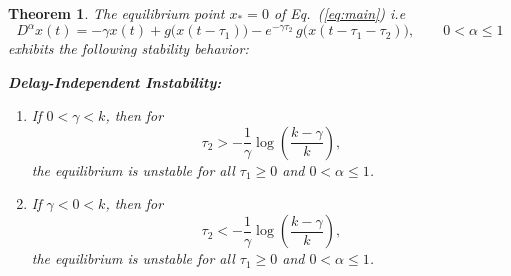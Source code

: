 \documentclass[10pt,a4paper]{amsart}
\newtheorem{theorem}{Theorem}
\begin{document}
\begin{theorem}
	\label{thmcase2_unified}
	The equilibrium point $x_* = 0$ of Eq.~(\ref{eq:main}) i.e 
		\begin{equation}
		D^{\alpha} x(t)
		= -\gamma x(t)
		+ g\big(x(t - \tau_1)\big)
		- e^{-\gamma \tau_2}\, g\big(x(t - \tau_1 - \tau_2)\big),
		\qquad 0 < \alpha \le 1
	\end{equation}
	 exhibits the following stability behavior:
	
	\textbf{Delay-Independent Instability:}
	\begin{enumerate}[label=(\roman*)]
		\item If $0 < \gamma < k$, then for 
		\[
		\tau_2 > -\frac{1}{\gamma} \log\left(\frac{k - \gamma}{k}\right),
		\]
		the equilibrium is unstable for all $\tau_1 \ge 0$ and $0 < \alpha \le 1$.
		
		\item If $\gamma < 0 < k$, then for 
		\[
		\tau_2 < -\frac{1}{\gamma} \log\left(\frac{k - \gamma}{k}\right),
		\]
		the equilibrium is unstable for all $\tau_1 \ge 0$ and $0 < \alpha \le 1$.
	\end{enumerate}
	
\end{theorem}
\end{document}
